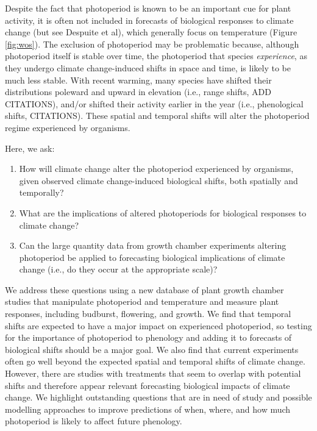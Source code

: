 \documentclass{article}
\begin{document}
\par Despite the fact that photoperiod is known to be an important cue for plant activity, it is often not included in forecasts of biological responses to climate change (but see Despuite et al), which generally focus on temperature (Figure \ref{fig:wos}). The exclusion of photoperiod may be problematic because, although photoperiod itself is stable over time, the photoperiod that species \emph{experience}, as they undergo climate change-induced shifts in space and time, is likely to be much less stable. With recent warming, many species have shifted their distributions poleward and upward in elevation (i.e., range shifts, ADD CITATIONS), and/or shifted their activity earlier in the year (i.e., phenological shifts, CITATIONS). These spatial and temporal shifts will alter the photoperiod regime experienced by organisms. 
\par Here, we ask: 
\begin{enumerate}
\item How will climate change alter the photoperiod experienced by organisms, given observed climate change-induced biological shifts, both spatially and temporally?
\item What are the implications of altered photoperiods for biological responses to climate change?
\item Can the large quantity data from growth chamber experiments altering photoperiod be applied to forecasting biological implications of climate change (i.e., do they occur at the appropriate scale)?

\end{enumerate}
\par We address these questions using a new database of plant growth chamber studies that manipulate photoperiod and temperature and measure plant responses, including budburst, flowering, and growth. We find that %
temporal shifts are expected to have a major impact on experienced photoperiod, so testing for the importance of photoperiod to phenology and adding it to forecasts of biological shifts should be a major goal. We also find that current experiments often go well beyond the expected spatial and temporal shifts of climate change. However, there are studies with treatments that seem to overlap with potential shifts and therefore appear relevant forecasting biological impacts of climate change. We highlight outstanding questions that are in need of study and possible modelling approaches to improve predictions of when, where, and how much photoperiod is likely to affect future phenology.
\end{document}
